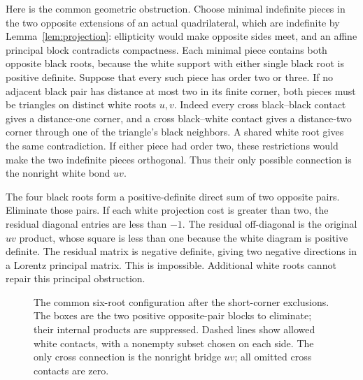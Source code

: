 \documentclass[11pt]{article}
\begin{document}
Here is the common geometric obstruction. Choose minimal indefinite
pieces in the two opposite extensions of an actual quadrilateral,
which are indefinite by Lemma~\ref{lem:projection}: ellipticity would
make opposite sides meet, and an affine principal block contradicts
compactness. Each minimal piece contains both opposite black roots,
because the white support with either single black root is positive
definite. Suppose that every such piece has order two or three. If no
adjacent black pair has distance at most two in its finite corner,
both pieces must be triangles on distinct white roots $u,v$.
Indeed every cross black--black contact gives a distance-one corner,
and a cross black--white contact gives a distance-two corner through
one of the triangle's black neighbors. A shared white root gives
the same contradiction. If either piece had order two, these
restrictions would make the two indefinite pieces orthogonal.
Thus their only possible connection is the nonright white bond $uv$.

The four black roots form a positive-definite direct sum of two
opposite pairs. Eliminate those pairs. If each white projection cost
is greater than two, the residual diagonal entries are less than
$-1$. The residual off-diagonal is the original $uv$ product, whose
square is less than one because the white diagram is positive definite.
The residual matrix is negative definite, giving two negative
directions in a Lorentz principal matrix. This is impossible.
Additional white roots cannot repair this principal obstruction.

\begin{figure}[htbp]
\centering
{}
\caption{The common six-root configuration after the short-corner
exclusions. The boxes are the two positive opposite-pair blocks to
eliminate; their internal products are suppressed. Dashed lines show
allowed white contacts, with a nonempty subset chosen on each side.
The only cross connection is the nonright bridge $uv$; all omitted
cross contacts are zero.}
\label{fig:two-white-Schur}
\end{figure}
\end{document}
